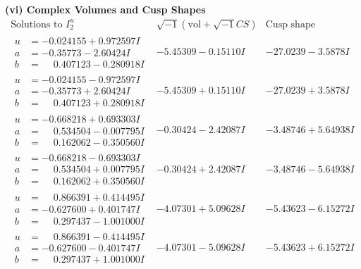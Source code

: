 \documentclass[1p]{elsarticle_modified}
\theoremstyle{definition}
\newcommand{\I}{\sqrt{-1}}
\begin{document}
\newpage\flushleft \textbf{(vi) Complex Volumes and Cusp Shapes}
$$\begin{array}{c|c|c}  
\text{Solutions to }I^u_{2}& \I (\text{vol} + \sqrt{-1}CS) & \text{Cusp shape}\\
 \hline 
\begin{aligned}
u &= -0.024155 + 0.972597 I \\
a &= -0.35773 - 2.60424 I \\
b &= \phantom{-}0.407123 - 0.280918 I\end{aligned}
 & -5.45309 - 0.15110 I & -27.0239 - 3.5878 I \\ \hline\begin{aligned}
u &= -0.024155 - 0.972597 I \\
a &= -0.35773 + 2.60424 I \\
b &= \phantom{-}0.407123 + 0.280918 I\end{aligned}
 & -5.45309 + 0.15110 I & -27.0239 + 3.5878 I \\ \hline\begin{aligned}
u &= -0.668218 + 0.693303 I \\
a &= \phantom{-}0.534504 - 0.007795 I \\
b &= \phantom{-}0.162062 - 0.350560 I\end{aligned}
 & -0.30424 - 2.42087 I & -3.48746 + 5.64938 I \\ \hline\begin{aligned}
u &= -0.668218 - 0.693303 I \\
a &= \phantom{-}0.534504 + 0.007795 I \\
b &= \phantom{-}0.162062 + 0.350560 I\end{aligned}
 & -0.30424 + 2.42087 I & -3.48746 - 5.64938 I \\ \hline\begin{aligned}
u &= \phantom{-}0.866391 + 0.414495 I \\
a &= -0.627600 + 0.401747 I \\
b &= \phantom{-}0.297437 - 1.001000 I\end{aligned}
 & -4.07301 + 5.09628 I & -5.43623 - 6.15272 I \\ \hline\begin{aligned}
u &= \phantom{-}0.866391 - 0.414495 I \\
a &= -0.627600 - 0.401747 I \\
b &= \phantom{-}0.297437 + 1.001000 I\end{aligned}
 & -4.07301 - 5.09628 I & -5.43623 + 6.15272 I \\ \hline\begin{aligned}

\end{aligned}
\end{array}$$
\end{document}
